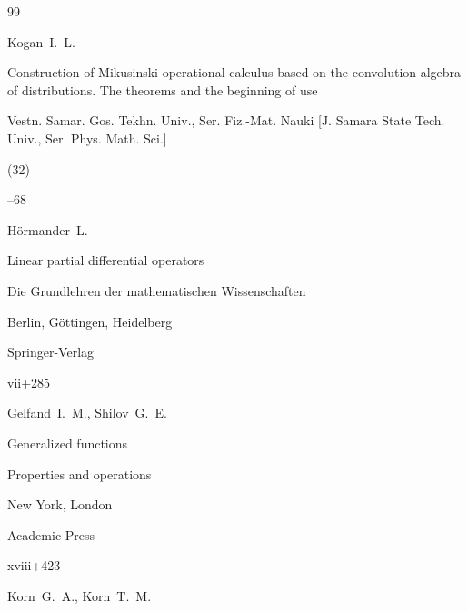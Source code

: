 \begin{thebibliography}{99}




\by Kogan~I.~L.

\paper Construction of Mikusinski operational calculus based on the convolution algebra of distributions. The theorems and the beginning of use

\jour Vestn. Samar. Gos. Tekhn. Univ., Ser. Fiz.-Mat. Nauki [J. Samara State Tech. Univ., Ser. Phys. Math. Sci.]


(32) 

--68








\by H\"{o}rmander~L.

\book Linear partial differential operators

\serial Die Grundlehren der mathematischen Wissenschaften


\publaddr Berlin,  G\"{o}ttingen, Heidelberg

\publ Springer-Verlag

\totalpages vii+285 






\by Gelfand~I.~M., Shilov~G.~E.

\book Generalized functions


\volinfo  Properties and operations

\publaddr New York, London

\publ Academic Press


\totalpages xviii+423







\by Korn~G.~A., Korn~T.~M.


\end{thebibliography}
